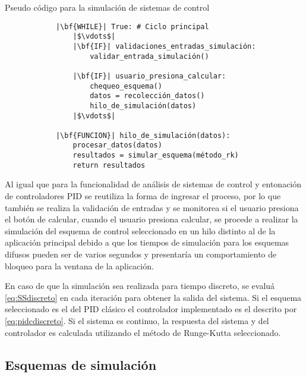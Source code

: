     \begin{longlisting}
        \caption[Pseudo código - Simulación de sistemas de control]{Pseudo código para la simulación de sistemas de control}
        \label{code:simulacion}				
        \begin{verbatim}
            |\bf{WHILE}| True: # Ciclo principal
                |$\vdots$|
                |\bf{IF}| validaciones_entradas_simulación:
                    validar_entrada_simulación()
                
                |\bf{IF}| usuario_presiona_calcular:
                    chequeo_esquema()
                    datos = recolección_datos()
                    hilo_de_simulación(datos)
                |$\vdots$|
            
            |\bf{FUNCION}| hilo_de_simulación(datos):
                procesar_datos(datos)
                resultados = simular_esquema(método_rk)
                return resultados
        \end{verbatim}
    \end{longlisting}

    Al igual que para la funcionalidad de análisis de sistemas de control y entonación de controladores PID se reutiliza la forma de ingresar el proceso, por lo que también se realiza la validación de entradas y se monitorea si el usuario presiona el botón de calcular, cuando el usuario presiona calcular, se procede a realizar la simulación del esquema de control seleccionado en un hilo distinto al de la aplicación principal debido a que los tiempos de simulación para los esquemas difusos pueden ser de varios segundos y presentaría un comportamiento de bloqueo para la ventana de la aplicación.

    En caso de que la simulación sea realizada para tiempo discreto, se evaluá \cref{eq:SSdiscreto} en cada iteración para obtener la salida del sistema. Si el esquema seleccionado es el del PID clásico el controlador implementado es el descrito por \cref{eq:pidcdiscreto}. Si el sistema es continuo, la respuesta del sistema y del controlador es calculada utilizando el método de Runge-Kutta seleccionado.

    \subsection{Esquemas de simulación}


